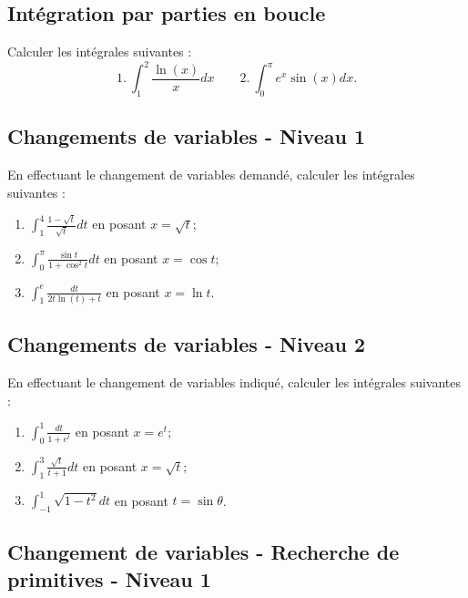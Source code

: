 

\vspace{1em}
\subsection{Intégration par parties en boucle}

Calculer les intégrales suivantes :
$$1.\ \int_1^2 \frac{\ln(x)}{x}dx\quad\quad 2.\ \int_0^\pi e^x\sin(x)dx.$$




\vspace{1em}
\subsection{Changements de variables - Niveau 1}

En effectuant le changement de variables demandé, calculer les intégrales suivantes :
\begin{enumerate}
\item $\displaystyle \int_1^4\frac{1-\sqrt t}{\sqrt t}dt$ en posant $x=\sqrt t$;
\item $\displaystyle \int_0^{\pi}\frac{\sin t}{1+\cos^2 t}dt$ en posant $x=\cos t$;
\item $\displaystyle \int_1^e \frac{dt}{2t\ln (t)+t}$ en posant $x=\ln t$.
\end{enumerate}




\vspace{1em}
\subsection{Changements de variables - Niveau 2}

En effectuant le changement de variables indiqué, calculer les intégrales suivantes :
\begin{enumerate}
\item  $\displaystyle \int_0^1\frac{dt}{1+e^t}$ en posant $x=e^t$;
\item $\displaystyle \int_1^3\frac{\sqrt t}{t+1}dt$ en posant $x=\sqrt t$;
\item $\displaystyle \int_{-1}^1 \sqrt{1-t^2}dt$ en posant $t=\sin\theta$.
\end{enumerate}




\vspace{1em}
\subsection{Changement de variables - Recherche de primitives - Niveau 1}

